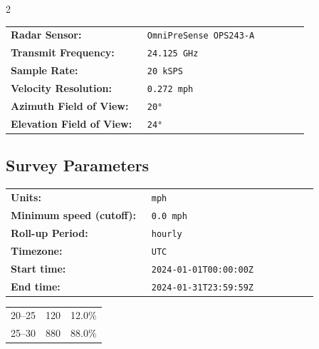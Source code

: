 \documentclass[10pt,letterpaper]{article}
\begin{document}
\begin{multicols}{2}
{
\small
\setlength{\tabcolsep}{2pt}
\renewcommand{\arraystretch}{1.00}
\begin{tabular}{>{\raggedright\arraybackslash\bfseries}p{0.44\linewidth}>{\raggedright\arraybackslash}p{0.52\linewidth}}
Radar Sensor: & \texttt{OmniPreSense OPS243-A} \\

Transmit Frequency: & \texttt{24.125 GHz} \\
Sample Rate: & \texttt{20 kSPS} \\
Velocity Resolution: & \texttt{0.272 mph} \\
Azimuth Field of View: & \texttt{20°} \\
Elevation Field of View: & \texttt{24°} \\
\end{tabular}
}

\subsection*{Survey Parameters}

{
\small
\setlength{\tabcolsep}{2pt}
\renewcommand{\arraystretch}{1.00}
\begin{tabular}{>{\raggedright\arraybackslash\bfseries}p{0.44\linewidth}>{\raggedright\arraybackslash}p{0.52\linewidth}}
Units: & \texttt{mph} \\
Minimum speed (cutoff): & \texttt{0.0 mph} \\
Roll-up Period: & \texttt{hourly} \\
Timezone: & \texttt{UTC} \\
Start time: & \texttt{2024-01-01T00:00:00Z} \\
End time: & \texttt{2024-01-31T23:59:59Z} \\

\end{tabular}
}




\par\vspace{2pt}
\noindent\begin{minipage}{\linewidth}
\par\vspace{2pt}
\begin{tabular}{lrr}
20--25 & 120 & 12.0\% \\
25--30 & 880 & 88.0\% \\
\end{tabular}
\end{minipage}
\par\vspace{0pt}




\end{multicols}
\end{document}
